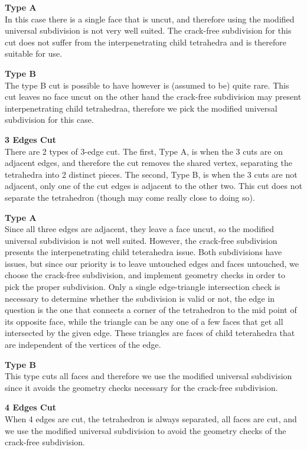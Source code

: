 \textbf{Type A}\\
In this case there is a single face that is uncut, and therefore using the modified universal subdivision is not very well suited. The crack-free subdivision for this cut does not suffer from the interpenetrating child tetrahedra and is therefore suitable for use.

\textbf{Type B}\\
The type B cut is possible to have however is (assumed to be) quite rare. This cut leaves no face uncut on the other hand the crack-free subdivision may present interpenetrating child tetrahedraa, therefore we pick the modified universal subdivision for this case.

\textbf{3 Edges Cut}\\
There are 2 types of 3-edge cut. The first, Type A, is when the 3 cuts are on adjacent edges, and therefore the cut removes the shared vertex, separating the tetrahedra into 2 distinct pieces. The second, Type B, is when the 3 cuts are not adjacent, only one of the cut edges is adjacent to the other two. This cut does not separate the tetrahedron (though may come really close to doing so).

\textbf{Type A}\\
Since all three edges are adjacent, they leave a face uncut, so the modified universal subdivision is not well suited. However, the crack-free subdivision presents the interpenetrating child teterahedra issue. Both subdivisions have issues, but since our priority is to leave untouched edges and faces untouched, we choose the crack-free subdivision, and implement geometry checks in order to pick the proper subdivision. Only a single edge-triangle intersection check is necessary to determine whether the subdivision is valid or not, the edge in question is the one that connects a corner of the tetrahedron to the mid point of its opposite face, while the triangle can be any one of a few faces that get all intersected by the given edge. These triangles are faces of child teterahedra that are independent of the vertices of the edge.

\textbf{Type B}\\
This type cuts all faces and therefore we use the modified universal subdivision since it avoids the geometry checks necessary for the crack-free subdivision.

\textbf{4 Edges Cut}\\
When 4 edges are cut, the tetrahedron is always separated, all faces are cut, and we use the modified universal subdivision to avoid the geometry checks of the crack-free subdivision.

